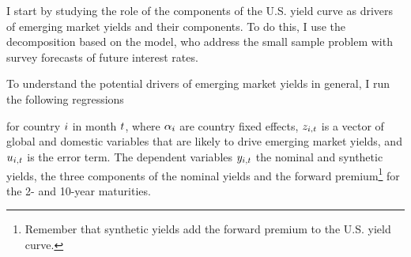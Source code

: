 {%
I start by studying the role of the components of the U.S. yield curve as drivers of emerging market yields and their components.
To do this, I use the decomposition based on the \cite{KimWright:2005} model, who address the small sample problem with survey forecasts of future interest rates.

To understand the potential drivers of emerging market yields in general, I run the following regressions 

\noindent for country \(i\) in month \(t\), where \(\alpha_{i}\) are country fixed effects, \(z_{i,t}\) is a vector of global and domestic variables that are likely to drive emerging market yields, and \(u_{i,t}\) is the error term. 
The dependent variables \(y_{i,t}\) the nominal and synthetic yields, the three components of the nominal yields and the forward premium\footnote{ Remember that synthetic yields add the forward premium to the U.S. yield curve.} for the 2- and 10-year maturities.

}
